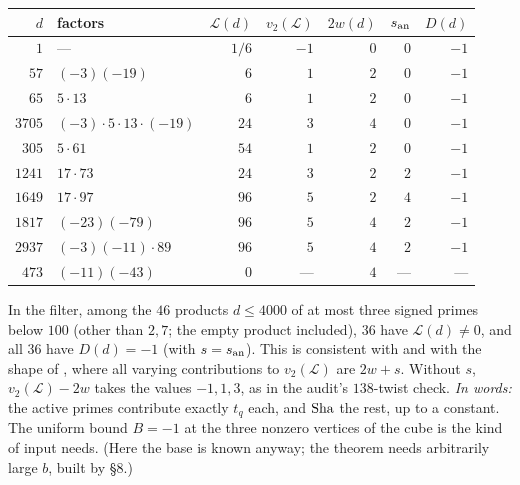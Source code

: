 \documentclass[11pt]{article}
\theoremstyle{remark}
\newcommand{\cL}{\mathcal L}
\newcommand{\Sha}{\text{\rm Sha}}
\begin{document}
\begin{center}\small
\begin{tabular}{@{}rlrrrrr@{}}
\toprule
$d$ & factors & $\cL(d)$ & $v_2(\cL)$ & $2w(d)$ & $s_{\rm an}$ & $D(d)$ \\
\midrule
$1$ & --- & $1/6$ & $-1$ & $0$ & $0$ & $-1$ \\
$57$ & $(-3)(-19)$ & $6$ & $1$ & $2$ & $0$ & $-1$ \\
$65$ & $5\cdot13$ & $6$ & $1$ & $2$ & $0$ & $-1$ \\
$3705$ & $(-3)\cdot5\cdot13\cdot(-19)$ & $24$ & $3$ & $4$ & $0$ & $-1$ \\
\midrule
$305$ & $5\cdot61$ & $54$ & $1$ & $2$ & $0$ & $-1$ \\
$1241$ & $17\cdot73$ & $24$ & $3$ & $2$ & $2$ & $-1$ \\
$1649$ & $17\cdot97$ & $96$ & $5$ & $2$ & $4$ & $-1$ \\
$1817$ & $(-23)(-79)$ & $96$ & $5$ & $4$ & $2$ & $-1$ \\
$2937$ & $(-3)(-11)\cdot89$ & $96$ & $5$ & $4$ & $2$ & $-1$ \\
$473$ & $(-11)(-43)$ & $0$ & --- & $4$ & --- & --- \\
\bottomrule
\end{tabular}
\end{center}

In the filter, among the $46$ products $d\le4000$ of at most three signed
primes below $100$ (other than $2,7$; the empty product included), $36$ have $\cL(d)\ne0$, and all $36$ have $D(d)=-1$
(with $s=s_{\rm an}$). This is consistent with  and
with the shape of , where all varying contributions to
$v_2(\cL)$ are $2w+s$. Without $s$, $v_2(\cL)-2w$ takes the values $-1,1,3$,
as in the audit's $138$-twist check. \emph{In words:} the active primes
contribute exactly $t_q$ each, and $\Sha$ the rest, up to a constant. The
uniform bound $B=-1$ at the three nonzero vertices of the cube is the kind
of input  needs. (Here the base is known anyway; the
theorem needs arbitrarily large $b$, built by \S8.)
\end{document}
